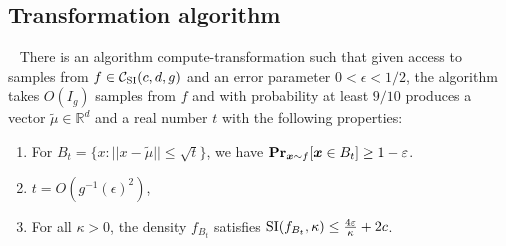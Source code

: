 \subsection{Transformation algorithm} \label{sec:transformation}



\begin{lemma}~\label{lem:transformation}
There is an algorithm \textsf{compute-transformation} such that given
access to samples from $f \in {\mathcal C}_{\mathrm{SI}}(c,d,g)$ and an error parameter
$0 < \epsilon < 1/2$, the algorithm takes $O(I_g)$ samples from $f$ and with
probability at least $9/10$ produces a vector $\tilde{\mu} \in \mathbb{R}^d$
and a real number $t$ with the following properties:
\begin{enumerate}
\item For $B_{t} = \{x : || x-\tilde{\mu} ||  \le \sqrt{t} \}$, we have 
$\operatorname{{\bf Pr}}_{\boldsymbol{x} \sim f} [ \boldsymbol{x} \in B_t ] \geq 1 - \varepsilon$.
\item 
$t = O(g^{-1}(\epsilon)^2)$,
\item  
For all $\kappa > 0$, the density $f_{B_t}$ satisfies
${\mathrm{SI}}(f_{B_t},\kappa) \leq \frac{4\varepsilon}{\kappa} + 2 c$.
\end{enumerate}
\end{lemma}
